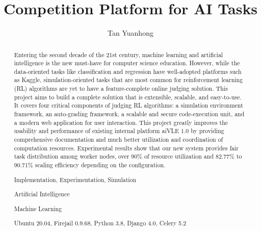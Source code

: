 \documentclass[fyp]{socreport}
\begin{document}
\title{Competition Platform for AI Tasks}
\author{Tan Yuanhong}
\maketitle
\begin{abstract}
Entering the second decade of the 21st century, machine learning and artificial intelligence is the new must-have for computer science education. However, while the data-oriented tasks like classification and regression have well-adopted platforms such as Kaggle, simulation-oriented tasks that are most common for reinforcement learning (RL) algorithms are yet to have a feature-complete online judging solution. This project aims to build a complete solution that is extensible, scalable, and easy-to-use. It covers four critical components of judging RL algorithms: a simulation environment framework, an auto-grading framework, a scalable and secure code-execution unit, and a modern web application for user interaction. This project greatly improves the usability and performance of existing internal platform aiVLE 1.0 by providing comprehensive documentation and much better utilization and coordination of computation resources. Experimental results show that our new system provides fair task distribution among worker nodes, over 90\% of resource utilization and 82.77\% to 90.71\% scaling efficiency depending on the configuration. 

\begin{project-nature}
	Implementation, Experimentation, Simulation
\end{project-nature}
\begin{keywords}
    \item Artificial Intelligence
	\item Machine Learning
\end{keywords}
\begin{implement}
	Ubuntu 20.04, Firejail 0.9.68, Python 3.8, Django 4.0, Celery 5.2
\end{implement}
\end{abstract}

\end{document}

